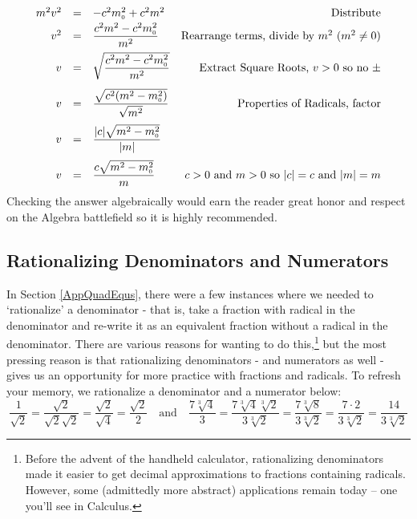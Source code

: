 \begin{ex}
\begin{enumerate}
\[\begin{array}{rclr}
m^2 v^2 & = & -c^2m_{\text{\tiny$0$}}^{2} + c^2 m^2 & \text{Distribute} \\[2pt]

v^2  & = & \dfrac{c^2 m^2 -c^2m_{\text{\tiny$0$}}^{2}}{m^2} & \text{Rearrange terms, divide by $m^2$ ($m^2 \neq 0$)} \\[8pt]

v & = & \sqrt{\dfrac{c^2 m^2 -c^2m_{\text{\tiny$0$}}^{2}}{m^2}} & \text{Extract Square Roots, $v > 0$ so no $\pm$} \\[12pt]

v & = & \dfrac{\sqrt{c^2 (m^2 -m_{\text{\tiny$0$}}^{2})}}{\sqrt{m^2}} & \text{Properties of Radicals, factor} \\[12pt]

v & = & \dfrac{|c|\sqrt{m^2 -m_{\text{\tiny$0$}}^{2}}}{|m|} &  \\[12pt]

v & = & \dfrac{c\sqrt{m^2 -m_{\text{\tiny$0$}}^{2}}}{m} & \text{$c > 0$ and $m > 0$ so $|c| = c$ and $|m| = m$} \\

\end{array}\] Checking the answer algebraically would earn the reader great honor and respect on the Algebra battlefield so it is highly recommended.

\end{enumerate}

\end{ex}

\subsection{Rationalizing Denominators and Numerators}
\label{rationalizingdenomandnumer}

In Section \ref{AppQuadEqus}, there were a few instances where we needed to `rationalize' a denominator - that is, take a fraction with radical in the denominator and re-write it as an equivalent fraction without a radical in the denominator.  There are various reasons for wanting to do this,\footnote{Before the advent of the handheld calculator, rationalizing denominators made it easier to get decimal approximations to fractions containing radicals.   However, some (admittedly more abstract) applications remain today --   one you'll see in Calculus.} but the most pressing reason is that rationalizing denominators - and numerators as well - gives us an opportunity for more practice with fractions and radicals. To refresh your memory, we rationalize a denominator and a numerator below: \[ \dfrac{1}{\sqrt{2}} = \dfrac{\sqrt{2}}{\sqrt{2} \sqrt{2}} = \dfrac{\sqrt{2}}{\sqrt{4}} = \dfrac{\sqrt{2}}{2} \quad \text{and} \quad \dfrac{7\sqrt[3]{4}}{3} = \dfrac{7 \sqrt[3]{4}\sqrt[3]{2}}{3\sqrt[3]{2}} = \dfrac{7\sqrt[3]{8}}{3\sqrt[3]{2}} = \dfrac{7 \cdot 2}{3\sqrt[3]{2}} =  \dfrac{14}{3\sqrt[3]{2}} \]

